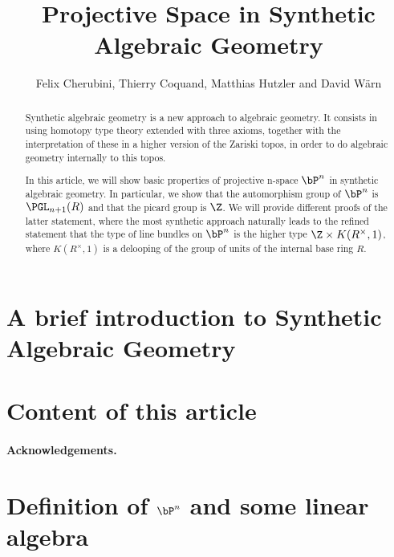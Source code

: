\documentclass{../util/zariski-small}
\title{Projective Space in Synthetic Algebraic Geometry}
\begin{document}
\author{Felix Cherubini, Thierry Coquand, Matthias Hutzler and David Wärn}

\maketitle

\begin{abstract}
  Synthetic algebraic geometry is a new approach to algebraic geometry. It consists in using homotopy type theory extended with three axioms, together with the interpretation of these in a higher version of the Zariski topos, in order to do algebraic geometry internally to this topos.
  
  In this article, we will show basic properties of projective n-space $\bP^n$ in synthetic algebraic geometry.
  In particular, we show that the automorphism group of $\bP^n$ is $\PGL_{n+1}(R)$ and that the picard group is $\Z$.
  We will provide different proofs of the latter statement, where the most synthetic approach naturally leads to the refined statement that the type of line bundles on $\bP^n$ is the higher type $\Z\times K(R^\times,1)$, where $K(R^\times,1)$ is a delooping of the group of units of the internal base ring $R$.
\end{abstract}

\section*{A brief introduction to Synthetic Algebraic Geometry}


\section*{Content of this article}

\paragraph{Acknowledgements.}


\section[Definition of projective space and some linear algebra]{Definition of $\bP^n$ and some linear algebra}


%
\end{document}

